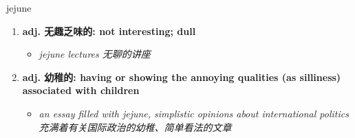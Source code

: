
\begin{frame}
{\huge jejune}
\begin{center}
\begin{enumerate}\Large
  \item \textbf{adj. 无趣乏味的: not interesting; dull}
  \begin{itemize}
    \item \em{\Large{jejune lectures 无聊的讲座}}
  \end{itemize}
  \item \textbf{adj. 幼稚的: having or showing the annoying qualities (as silliness) associated with children}
  \begin{itemize}
    \item \em{\Large{an essay filled with jejune, simplistic opinions about international politics 充满着有关国际政治的幼稚、简单看法的文章}}
  \end{itemize}
\end{enumerate}
\end{center}
\end{frame}
